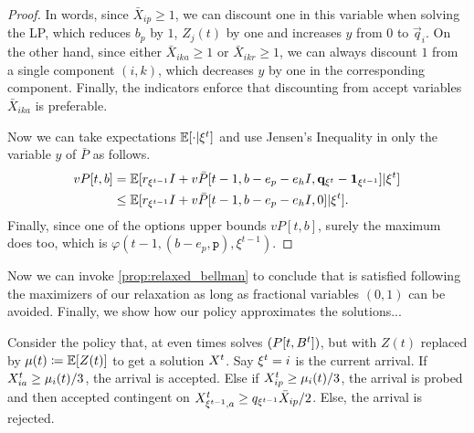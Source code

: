 \begin{proof}
In words, since $\bar X_{ip}\geq 1$, we can discount one in this variable when solving the LP, which reduces $b_p$ by $1$, $Z_j(t)$ by one and increases $y$ from $0$ to $\vec q_{i}$.
On the other hand, since either $\bar X_{ika}\geq 1$ or $\bar X_{ikr}\geq 1$, we can always discount $1$ from a single component $(i,k)$, which decreases $y$ by one in the corresponding component.
Finally, the indicators enforce that discounting from accept variables $\bar X_{ika}$ is preferable.

Now we can take expectations $\mathbb{E}[\cdot |\xi^t]$ and use Jensen's Inequality in only the variable $y$ of $\bar P$ as follows.
\begin{align*}
vP[t,b] &= \mathbb{E}[r_{\xi^{t-1}}I + v\bar P[t-1,b-e_p-e_hI,\mathbf q_{\xi^t}-\mathbf 1_{\xi^{t-1}}] |\xi^t] \\
&\leq \mathbb{E}[r_{\xi^{t-1}}I+ v\bar P[t-1,b-e_p-e_hI, 0] |\xi^t].
\end{align*}
Finally, since one of the options upper bounds $vP[t,b]$, surely the maximum does too, which is $\varphi(t-1,(b-e_p,\texttt{p}),\xi^{t-1})$.

\end{proof}

Now we can invoke \cref{prop:relaxed_bellman} to conclude that \off is satisfied following the maximizers of our relaxation as long as fractional variables $(0,1)$ can be avoided.
Finally, we show how our policy approximates the solutions... \todonote

Consider the policy that, at even times solves $(P[t,B^t])$, but with $Z(t)$ replaced by $\mu(t)\coloneqq \mathbb{E}[Z(t)]$ to get a solution $X^t$.
Say $\xi^t=i$ is the current arrival.
If $X^t_{ia}\geq \mu_{i}(t)/3$, the arrival is accepted.
Else if $X^t_{ip} \geq \mu_i(t)/3$, the arrival is probed and then accepted contingent on $X^t_{\xi^{t-1},a}\geq q_{\xi^{t-1}}\bar X_{ip}/2$.
Else, the arrival is rejected.

